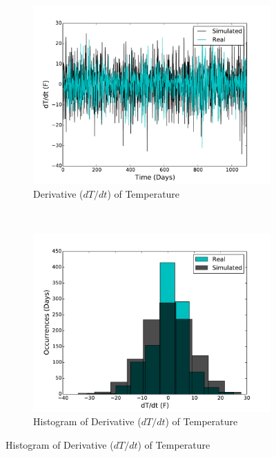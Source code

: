 \documentclass[11pt, letterpaper]{article}
\begin{document}
\begin{figure}[H]
\begin{subfigure}[b]{0.45\textwidth}
    \includegraphics[width=\textwidth]{figures/sim_vel.pdf}
    \caption{\label{fig:analysis-autocorr} Derivative ($dT/dt$) of Temperature}
  \end{subfigure}
  ~
  \begin{subfigure}[b]{0.45\textwidth}
    \includegraphics[width=\textwidth]{figures/sim_vel_hist.pdf}
    \caption{\label{fig:analysis-autocorr} Histogram of Derivative ($dT/dt$) of Temperature}
  \end{subfigure}

\end{figure}
\end{document}
